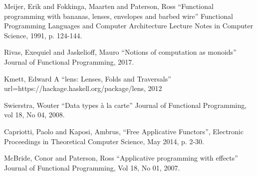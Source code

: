 \documentclass[letterpaper, 10 pt, conference]{ieeeconf}
\begin{document}
\begin{thebibliography}{99}

 Meijer, Erik and Fokkinga, Maarten and Paterson, Ross ``Functional programming with bananas, lenses, envelopes and barbed wire'' Functional Programming Languages and Computer Architecture Lecture Notes in Computer Science, 1991, p. 124-144.

  Rivas, Exequiel and Jaskelioff, Mauro ``Notions of computation as monoids'' Journal of Functional Programming, 2017.

 Kmett, Edward A ``lens: Lenses, Folds and Traversals'' url={https://hackage.haskell.org/package/lens}, 2012

Swierstra, Wouter ``Data types \`a la carte'' Journal of Functional Programming, vol 18, No 04, 2008.

 Capriotti, Paolo and Kaposi, Ambrus, ``Free Applicative Functors'', Electronic Proceedings in Theoretical Computer Science, May 2014, p. 2-30.

 McBride, Conor and Paterson, Ross ``Applicative programming with effects'' Journal of Functional Programming, Vol 18, No 01, 2007.

\end{thebibliography}
\end{document}
